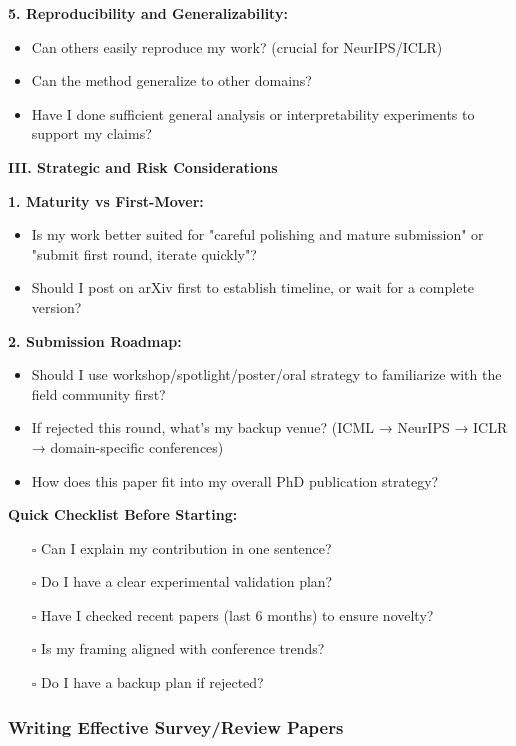 \documentclass[11pt,a4paper]{article}
\begin{document}
\textbf{5. Reproducibility and Generalizability:}
\begin{itemize}
    \item Can others easily reproduce my work? (crucial for NeurIPS/ICLR)
    \item Can the method generalize to other domains?
    \item Have I done sufficient general analysis or interpretability experiments to support my claims?
\end{itemize}

\textbf{III. Strategic and Risk Considerations}

\textbf{1. Maturity vs First-Mover:}
\begin{itemize}
    \item Is my work better suited for "careful polishing and mature submission" or "submit first round, iterate quickly"?
    \item Should I post on arXiv first to establish timeline, or wait for a complete version?
\end{itemize}

\textbf{2. Submission Roadmap:}
\begin{itemize}
    \item Should I use workshop/spotlight/poster/oral strategy to familiarize with the field community first?
    \item If rejected this round, what's my backup venue? (ICML → NeurIPS → ICLR → domain-specific conferences)
    \item How does this paper fit into my overall PhD publication strategy?
\end{itemize}

\textbf{Quick Checklist Before Starting:}
\begin{enumerate}
    \item[$\square$] Can I explain my contribution in one sentence?
    \item[$\square$] Do I have a clear experimental validation plan?
    \item[$\square$] Have I checked recent papers (last 6 months) to ensure novelty?
    \item[$\square$] Is my framing aligned with conference trends?
    \item[$\square$] Do I have a backup plan if rejected?
\end{enumerate}

\subsubsection{Writing Effective Survey/Review Papers}
\end{document}
